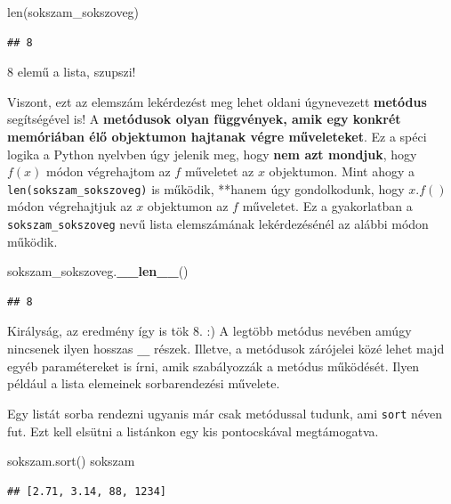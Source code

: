 \documentclass[
]{book}
\newenvironment{Shaded}{\begin{snugshade}}{\end{snugshade}}
\newcommand{\BuiltInTok}[1]{#1}
\newcommand{\FunctionTok}[1]{\textcolor[rgb]{0.13,0.29,0.53}{\textbf{#1}}}
\newcommand{\NormalTok}[1]{#1}
\begin{document}
\begin{Shaded}
\begin{Highlighting}[]
\BuiltInTok{len}\NormalTok{(sokszam\_sokszoveg)}
\end{Highlighting}
\end{Shaded}

\begin{verbatim}
## 8
\end{verbatim}

8 elemű a lista, szupszi!

Viszont, ezt az elemszám lekérdezést meg lehet oldani úgynevezett \textbf{metódus} segítségével is! A \textbf{metódusok olyan függvények, amik egy konkrét memóriában élő objektumon hajtanak végre műveleteket}. Ez a spéci logika a Python nyelvben úgy jelenik meg, hogy \textbf{nem azt mondjuk}, hogy \(f(x)\) módon végrehajtom az \(f\) műveletet az \(x\) objektumon. Mint ahogy a \texttt{len(sokszam\_sokszoveg)} is működik, **hanem úgy gondolkodunk, hogy \(x.f()\) módon végrehajtjuk az \(x\) objektumon az \(f\) műveletet.
Ez a gyakorlatban a \texttt{sokszam\_sokszoveg} nevű lista elemszámának lekérdezésénél az alábbi módon működik.

\begin{Shaded}
\begin{Highlighting}[]
\NormalTok{sokszam\_sokszoveg.}\FunctionTok{\_\_len\_\_}\NormalTok{()}
\end{Highlighting}
\end{Shaded}

\begin{verbatim}
## 8
\end{verbatim}

Királyság, az eredmény így is tök \(8\). :) A legtöbb metódus nevében amúgy nincsenek ilyen hosszas \texttt{\_\_} részek. Illetve, a metódusok zárójelei közé lehet majd egyéb paramétereket is írni, amik szabályozzák a metódus működését. Ilyen például a lista elemeinek sorbarendezési művelete.

Egy listát sorba rendezni ugyanis már csak metódussal tudunk, ami \texttt{sort} néven fut. Ezt kell elsütni a listánkon egy kis pontocskával megtámogatva.

\begin{Shaded}
\begin{Highlighting}[]
\NormalTok{sokszam.sort()}
\NormalTok{sokszam}
\end{Highlighting}
\end{Shaded}

\begin{verbatim}
## [2.71, 3.14, 88, 1234]
\end{verbatim}
\end{document}

